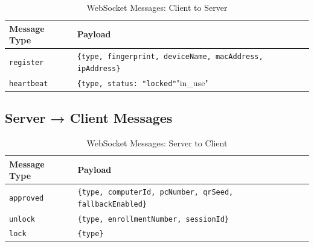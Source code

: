\begin{table}[h!]
\centering
\caption{WebSocket Messages: Client to Server}
\begin{tabularx}{\textwidth}{lX}
\toprule
\textbf{Message Type} & \textbf{Payload}\\
\midrule
\texttt{register} & \verb|{type, fingerprint, deviceName, macAddress, ipAddress}|\\
\rowcolor{aurxonlightgray}
\texttt{heartbeat} & \verb|{type, status: "locked"|"in_use"}|\\
\bottomrule
\end{tabularx}
\end{table}

\subsection{Server → Client Messages}

\begin{table}[h!]
\centering
\caption{WebSocket Messages: Server to Client}
\begin{tabularx}{\textwidth}{lX}
\toprule
\textbf{Message Type} & \textbf{Payload}\\
\midrule
\texttt{approved} & \verb|{type, computerId, pcNumber, qrSeed, fallbackEnabled}|\\
\rowcolor{aurxonlightgray}
\texttt{unlock} & \verb|{type, enrollmentNumber, sessionId}|\\
\texttt{lock} & \verb|{type}|\\
\bottomrule
\end{tabularx}
\end{table}
